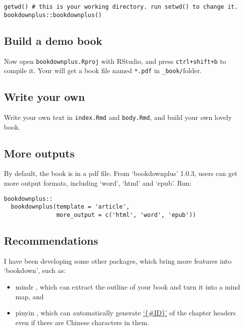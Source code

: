 \documentclass[bgd, online, hvmath]{style/copernicus-discussions}
\begin{document}
\begin{verbatim}
getwd() # this is your working directory. run setwd() to change it.
bookdownplus::bookdownplus()
\end{verbatim}

\hypertarget{build-a-demo-book}{%
\subsection{Build a demo book}\label{build-a-demo-book}}

Now open \texttt{bookdownplus.Rproj} with RStudio, and press \texttt{ctrl+shift+b} to compile it. Your will get a book file named \texttt{*.pdf} in \texttt{\_book/}folder.

\hypertarget{write-your-own}{%
\subsection{Write your own}\label{write-your-own}}

Write your own text in \texttt{index.Rmd} and \texttt{body.Rmd}, and build your own lovely book.

\hypertarget{more-outputs}{%
\subsection{More outputs}\label{more-outputs}}

By default, the book is in a pdf file. From `bookdownplus' 1.0.3, users can get more output formats, including `word', `html' and `epub'. Run:

\begin{verbatim}
bookdownplus::
  bookdownplus(template = 'article', 
               more_output = c('html', 'word', 'epub'))
\end{verbatim}

\hypertarget{recommendations}{%
\subsection{Recommendations}\label{recommendations}}

I have been developing some other packages, which bring more features into `bookdown', such as:

\begin{itemize}
\item
  mindr \citep{R-mindr}, which can extract the outline of your book and turn it into a mind map, and
\item
  pinyin \citep{R-pinyin}, which can automatically generate \href{https://bookdown.org/yihui/bookdown/cross-references.html}{`\{\#ID\}'} of the chapter headers even if there are Chinese characters in them.
\end{itemize}
\end{document}
